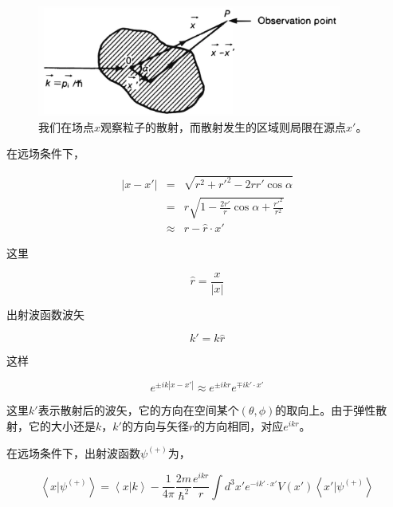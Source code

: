 \begin{figure}[htbp]
\begin{center}
\includegraphics[width=10cm]{Scattering/sourcefields.png}
\caption{我们在场点$x$观察粒子的散射，而散射发生的区域则局限在源点$x'$。}
\end{center}
\end{figure}

在远场条件下，

\begin{eqnarray*}
|x-x' |  & = & \sqrt{ r^2 + r'^2 - 2 r r' \cos \alpha }  \\ 
{} & = & r \sqrt{ 1- \frac{2r'}{r} \cos \alpha + \frac{r'^2}{r^2 } } \\
{} & \approx & r- \hat r \cdot x'
\end{eqnarray*}

这里

\begin{equation}
\hat r = \frac{x}{|x|}
\end{equation}

出射波函数波矢

\begin{equation}
k' = k \hat r
\end{equation}

这样

\begin{equation}
e^{\pm i k |x-x'| } \approx e^{\pm i k r} e^{\mp i k' \cdot x'}
\end{equation}

这里$k'$表示散射后的波矢，它的方向在空间某个$( \theta, \phi )$的取向上。由于弹性散射，它的大小还是$k$，$k'$的方向与矢径$r$的方向相同，对应$e^{i k r}$。

在远场条件下，出射波函数$\psi^{(+)}$为，

\begin{equation}
\left\langle x | \psi^{(+)}\right\rangle = \left\langle x | k \right\rangle - \frac{1}{4 \pi} \frac{2m}{\hbar^2} \frac{e^{i k r}}{r} \int d^3 x' e^{- i k' \cdot x' } V(x') \left\langle x' | \psi^{(+)}\right\rangle
\label{OutgoingWaveFunction}
\end{equation}

